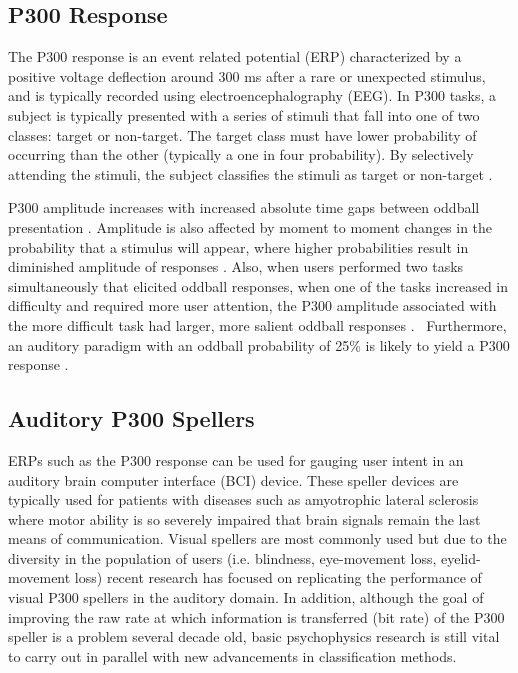 \documentclass[10pt]{article}
\begin{document}
\subsection{P300 Response} 
The P300 response is an event related
potential (ERP) characterized by a positive voltage deflection
around 300 ms after a rare or unexpected stimulus, and is typically recorded
using electroencephalography (EEG). In P300 tasks, a subject is
typically presented with a series of stimuli that fall into one of
two classes: target or non-target.  The target class must have lower
probability of occurring than the other (typically a one in four
probability).  By selectively attending the stimuli, the subject
classifies the stimuli as target or non-target \cite{Wolpaw2012}.

P300 amplitude increases with increased absolute time gaps
between oddball presentation \cite{GONSALVEZ2002}. 
Amplitude is also affected by moment to moment changes in the
probability that a stimulus will appear, where higher probabilities
result in diminished amplitude of responses
\cite{Donchin1981}.  Also, when users performed two tasks
simultaneously that elicited oddball responses, when one of
the tasks increased in difficulty and required more user
attention, the P300 amplitude associated with the more
difficult task had larger, more salient oddball responses
\cite{Sirevaag1989}.  Furthermore, an auditory paradigm with
an oddball probability of 25\% is likely to yield a P300
response \cite{Nijboer2008}. 

\subsection{Auditory P300 Spellers} 
ERPs such as the P300 response can be used for gauging user intent
in an auditory brain computer interface (BCI) device.
These speller
devices are typically used for patients with diseases such as
amyotrophic lateral sclerosis where motor ability is so severely
impaired that brain signals remain the last means of
communication\cite{Nijboer2008}.  Visual spellers are most commonly
used but due to the diversity in the population of users (i.e.
blindness, eye-movement loss, eyelid-movement loss) recent research
has focused on replicating the performance of visual P300 spellers
in the auditory domain.  In addition, although the goal of improving
the raw rate at which information is transferred (bit rate) of
the P300 speller is a problem several decade old, basic
psychophysics research is still vital to carry out in parallel with
new advancements in classification methods.
\end{document}
